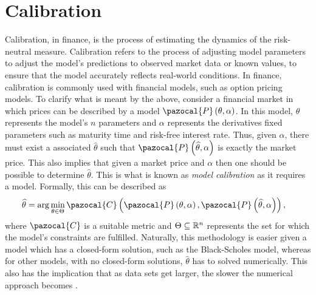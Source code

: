 \section{Calibration}\label{Sec.Calibration}
Calibration, in finance, is the process of estimating the dynamics of the risk-neutral measure. Calibration refers to the process of adjusting model parameters to adjust the model's predictions to observed market data or known values, to ensure that the model accurately reflects real-world conditions. In finance, calibration is commonly used with financial models, such as option pricing models. To clarify what is meant by the above, consider a financial market in which prices can be described by a model $\pazocal{P}\left(\theta,\alpha\right)$. In this model, $\theta$ represents the model's $n$ parameters and $\alpha$ represents the derivatives fixed parameters such as maturity time and risk-free interest rate. Thus, given $\alpha$, there must exist a associated $\widehat{\theta}$ such that $\pazocal{P}\left(\widehat{\theta},\alpha\right)$ is exactly the market price. This also implies that given a market price and $\alpha$ then one should be possible to determine $\widehat{\theta}$. This is what is known as \emph{model calibration} as it requires a model. Formally, this can be described as
\begin{align*}
    \widehat{\theta} &= \arg\min_{\theta\in\Theta}\pazocal{C}\left(\pazocal{P}\left(\theta,\alpha\right),\pazocal{P}\left(\widehat{\theta},\alpha\right)\right),
\end{align*}
where $\pazocal{C}$ is a suitable metric and $\Theta\subseteq\mathbb{R}^n$ represents the set for which the model's constraints are fulfilled. Naturally, this methodology is easier given a model which has a closed-form solution, such as the Black-Scholes model, whereas for other models, with no closed-form solutions, $\widehat{\theta}$ has to solved numerically. This also has the implication that as data sets get larger, the slower the numerical approach becomes \citep{Art}.

